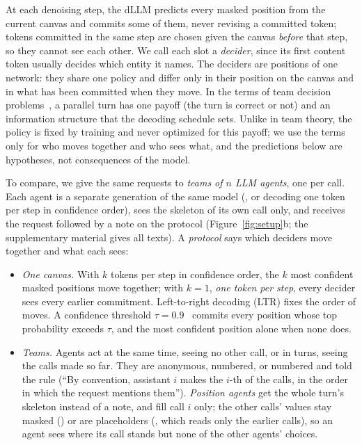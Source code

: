 At each denoising step, the dLLM predicts every masked position from the current canvas and commits some of them, never revising a committed token; tokens committed in the same step are chosen given the canvas \emph{before} that step, so they cannot see each other. We call each slot a \emph{decider}, since its first content token usually decides which entity it names. The deciders are positions of one network: they share one policy and differ only in their position on the canvas and in what has been committed when they move. In the terms of team decision problems~\cite{radner1962team,marschak1972teams}, a parallel turn has one payoff (the turn is correct or not) and an information structure that the decoding schedule sets. Unlike in team theory, the policy is fixed by training and never optimized for this payoff; we use the terms only for who moves together and who sees what, and the predictions below are hypotheses, not consequences of the model.

To compare, we give the same requests to \emph{teams of $n$ LLM agents}, one per call. Each agent is a separate generation of the same model (\qwen, or \dream decoding one token per step in confidence order), sees the skeleton of its own call only, and receives the request followed by a note on the protocol (Figure~\ref{fig:setup}b; the supplementary material gives all texts). A \emph{protocol} says which deciders move together and what each sees:
\begin{itemize}
\item \emph{One canvas.} With $k$ tokens per step in confidence order, the $k$ most confident masked positions move together; with $k=1$, \emph{one token per step}, every decider sees every earlier commitment. Left-to-right decoding (LTR) fixes the order of moves. A confidence threshold $\tau=0.9$~\cite{wu2026fastdllm} commits every position whose top probability exceeds $\tau$, and the most confident position alone when none does.
\item \emph{Teams.} Agents act at the same time, seeing no other call, or in turns, seeing the calls made so far. They are anonymous, numbered, or numbered and told the rule (``By convention, assistant $i$ makes the $i$-th of the calls, in the order in which the request mentions them''). \emph{Position agents} get the whole turn's skeleton instead of a note, and fill call $i$ only; the other calls' values stay masked (\dream) or are placeholders (\qwen, which reads only the earlier calls), so an agent sees where its call stands but none of the other agents' choices.
\end{itemize}

